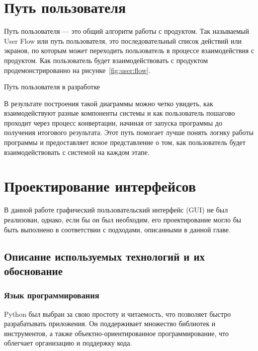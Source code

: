 \clearpage  %

\section{Путь пользователя}

Путь пользователя --- это общий алгоритм работы с продуктом. Так
называемый User Flow или путь пользователя, это последовательный
список действий или экранов, по которым может переходить
пользователь в процессе взаимодействия с продуктом.
Как пользователь будет взаимодействовать с продуктом
продемонстрированно на рисунке~\ref{fig:user:flow}.

\begin{image}
	\caption{Путь пользователя в разработке}
	\label{fig:user:flow}
\end{image}

В результате построения такой диаграммы можно четко увидеть,
как взаимодействуют разные компоненты системы
и как пользователь пошагово проходит через процесс конвертации,
начиная от запуска программы до получения итогового результата.
Этот путь помогает лучше понять логику работы программы
и предоставляет ясное представление о том,
как пользователь будет взаимодействовать с системой на каждом этапе.

\section{Проектирование интерфейсов}

В данной работе графический пользовательский интерфейс (GUI)
не был реализован, однако, если бы он был необходим,
его проектирование могло бы быть выполнено в соответствии с подходами,
описанными в данной главе.

\subsection{Описание используемых технологий и их обоснование}

\subsubsection{Язык программирования}

Python был выбран за свою простоту и читаемость,
что позволяет быстро разрабатывать приложения.
Он поддерживает множество библиотек и инструментов,
а также объектно-ориентированное программирование,
что облегчает организацию и поддержку кода.

